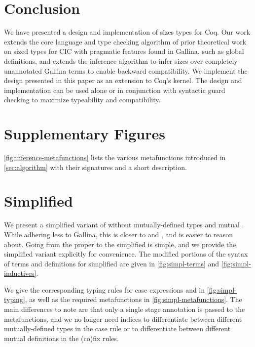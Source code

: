 \documentclass[acmsmall,screen,review,10pt]{acmart} %
\begin{document}
\section{Conclusion}
\label{sec:conclusion}
We have presented a design and implementation of sizes types for Coq.
Our work extends the core language and type checking algorithm of prior theoretical work on sized types for CIC with pragmatic features found in Gallina, such as global definitions, and extends the inference algorithm to infer sizes over completely unannotated Gallina terms to enable backward compatibility. We implement the design presented in this paper as an extension to Coq's kernel\cite{impl}. The design and implementation can be used alone or in conjunction with syntactic guard checking to maximize typeability and compatibility.

\clearpage




\clearpage

\appendix

\section{Supplementary Figures}\label{sec:figures}



\autoref{fig:inference-metafunctions} lists the various metafunctions introduced in \autoref{sec:algorithm} with their signatures and a short description.

\section{Simplified \titlelang}
We present a simplified variant of \lang without mutually-defined \coinductive types and mutual \cofixpoints. While adhering less to Gallina, this is closer to \CIChatbar and \CIChat, and is easier to reason about. Going from the proper \lang to the simplified \lang is simple, and we provide the simplified variant explicitly for convenience. The modified portions of the syntax of terms and \coinductive definitions for simplified \lang are given in \autoref{fig:simpl-terms} and \autoref{fig:simpl-inductives}.



We give the corresponding typing rules for case expressions and \cofixpoints in \autoref{fig:simpl-typing}, as well as the required metafunctions in \autoref{fig:simpl-metafunctions}. The main differences to note are that only a single stage annotation is passed to the metafunctions, and we no longer need indices to differentiate between different mutually-defined \coinductive types in the case rule or to differentiate between different mutual \cofixpoint definitions in the (co)fix rules.
\end{document}

